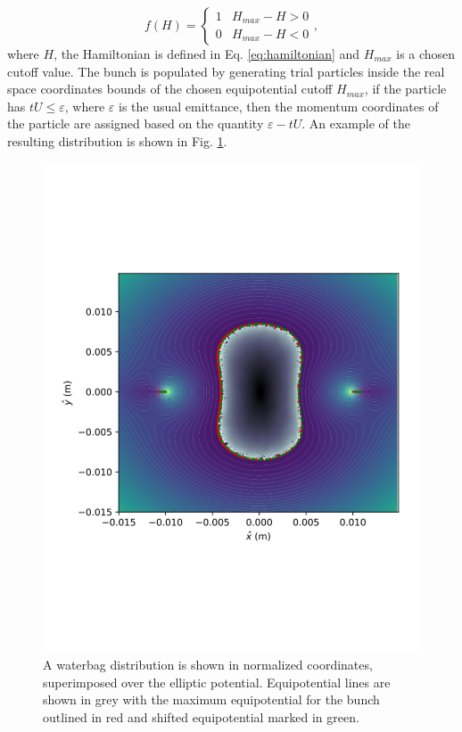 \documentclass[aps,prstab,twocolumn, groupedaddress]{revtex4-1}
\begin{document}
\begin{equation} \label{eq:distribution}
f(H) = 
\left\{
\begin{array}{lr}
1 &  H_{max} - H > 0 \\
0 &  H_{max} - H < 0
\end{array}
\right.,
\end{equation} 
where $H$, the Hamiltonian is defined in Eq. \ref{eq:hamiltonian} and $H_{max}$ is a 
chosen cutoff value. The bunch is populated by generating trial particles inside the real 
space coordinates bounds of the chosen equipotential cutoff $H_{max}$, if the particle 
has $ tU \leq \varepsilon$, where $\varepsilon$ is the usual emittance, then the 
momentum coordinates of the particle are assigned based on the quantity $\varepsilon - 
tU$. An example of the resulting distribution is shown in Fig. \ref{fig:wbdistr}.

\begin{figure}
	\includegraphics[width=\columnwidth]{distribution.pdf}%
	\caption{\label{fig:wbdistr} A waterbag distribution is shown in normalized coordinates, 
	superimposed over the elliptic potential. Equipotential lines are shown in grey with the 
	maximum equipotential for the bunch outlined in red and shifted equipotential marked 
	in green.}
\end{figure}
\end{document}
